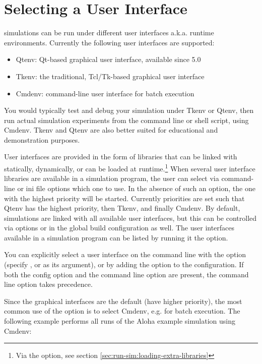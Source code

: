 \section{Selecting a User Interface}
\label{sec:run-sim:selecting-user-interface}

{\opp} simulations can be run under different user interfaces a.k.a. runtime
environments. Currently the following user interfaces are supported:

\begin{itemize}
  \item Qtenv: Qt-based graphical user interface, available since {\opp} 5.0
  \item Tkenv: the traditional, Tcl/Tk-based graphical user interface
  \item Cmdenv: command-line user interface for batch execution
\end{itemize}

You would typically test and debug your simulation under Tkenv or Qtenv,
then run actual simulation experiments from the command line or shell
script, using Cmdenv. Tkenv and Qtenv are also better suited for
educational and demonstration purposes.

User interfaces are provided in the form of libraries that can be linked with
statically, dynamically, or can be loaded at runtime.\footnote{Via the 
option, see section \ref{sec:run-sim:loading-extra-libraries}} When several user
interface libraries are available in a simulation program, the user can select
via command-line or ini file options which one to use. In the absence of such an
option, the one with the highest priority will be started. Currently priorities
are set such that Qtenv has the highest priority, then Tkenv, and finally
Cmdenv. By default, simulations are linked with all available user interfaces,
but this can be controlled via  options or in the {\opp}
global build configuration as well. The user interfaces available in a
simulation program can be listed by running it the 
option.

You can explicitly select a user interface on the command line with the 
option (specify ,  or  as its argument), or by
adding the  option to the configuration. If both
the config option and the command line option are present, the command line option
takes precedence.

Since the graphical interfaces are the default (have higher priority), the most
common use of the  option is to select Cmdenv, e.g. for batch execution.
The following example performs all runs of the Aloha example simulation using
Cmdenv:


